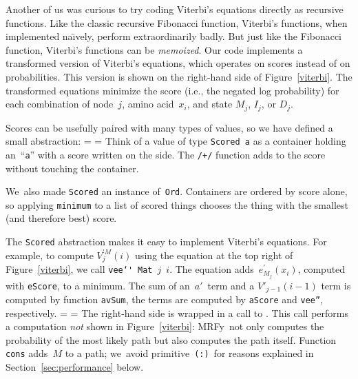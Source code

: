 \documentclass[nonatbib,preprint,blockstyle,times]{sigplanconf}
\newcommand\mrfy{MRFy} %
\newcommand\primcons{\texttt{\small(:)}}
\newcommand\naive{na\"\i ve}
\newcommand\figref[1]{Figure~\ref{#1}}
\newcommand\secref[1]{Section~\ref{sec:#1}}
\newcommand\seclabel[1]{\label{sec:#1}}
\newif\ifverbatimsmall
\newcommand\smallverbatiminput[1]{%
  \everypar=\expandafter{\the\everypar
       \verbatimsmallfalse
       \topsep=\standardvspace}%
  \topsep=0.78\topsep
  \verbatimsmalltrue}
\newcommand\smallfuzzverbatiminput[2]{%
  \everypar\expandafter{\the\everypar\hfuzz=0pt\relax}%
  \hfuzz=#1 \smallverbatiminput{#2}}
\begin{document}

Another of us was curious to try coding Viterbi's equations
directly as recursive functions.
Like the classic recursive Fibonacci function, Viterbi's functions,
when implemented \naive ly,
perform extraordinarily badly.
But just like the Fibonacci function, Viterbi's functions can be
\emph{memoized}.
Our code implements a transformed version of Viterbi's equations, 
which operates on scores instead of on probabilities.
This version is
shown on the right-hand side of \figref{viterbi}.
The transformed equations minimize the
score (i.e., the negated log probability) for each combination of
node~$j$, amino 
acid~$x_i$, and state $M_j$, $I_j$, or $D_j$.

Scores can be usefully paired with many types of values,
so we have defined a small abstraction:
\smallfuzzverbatiminput{10.8pt}{vscore}
Think of a value of type \texttt{Scored~a} as a container holding
 an~``\texttt a'' with a score written on the side.
The \texttt{/+/} function adds to the score without touching the
 container.

We~also made \texttt{Scored} an instance of~\texttt{Ord}.
Containers are ordered by score alone, so applying
\texttt{minimum} to a list of scored things chooses the thing with the
smallest (and therefore best) score.


\seclabel{cons}
\seclabel{vee-prime}

The \texttt{Scored} abstraction makes it easy to implement
Viterbi's equations.
For example, to compute $V_j^{\prime M}(i)$ using the equation at the top
right of \figref{viterbi}, we call 
\mbox{\texttt{vee\char`\'} \texttt{Mat} $j$ $i$}.
The equation adds~$e^{\prime}_{M_{j}}(x_{i})$, computed
with \texttt{eScore}, to a minimum.
The sum of an~$a'$~term and a $V'_{j-1}(i-1)$ term 
is computed by function \texttt{avSum},
the terms are computed by \texttt{aScore} and \texttt{vee''}, respectively.
\smallverbatiminput{vfix}
The right-hand side is wrapped in a call to
.
This call performs a computation \emph{not} shown in \figref{viterbi}:
\mrfy\ not only computes the probability of the most likely path but 
also computes the path itself.
Function \texttt{cons} adds~$M$ to a path;
we~avoid primitive~\primcons\ for reasons explained
in \secref{performance} below. 
\end{document}
